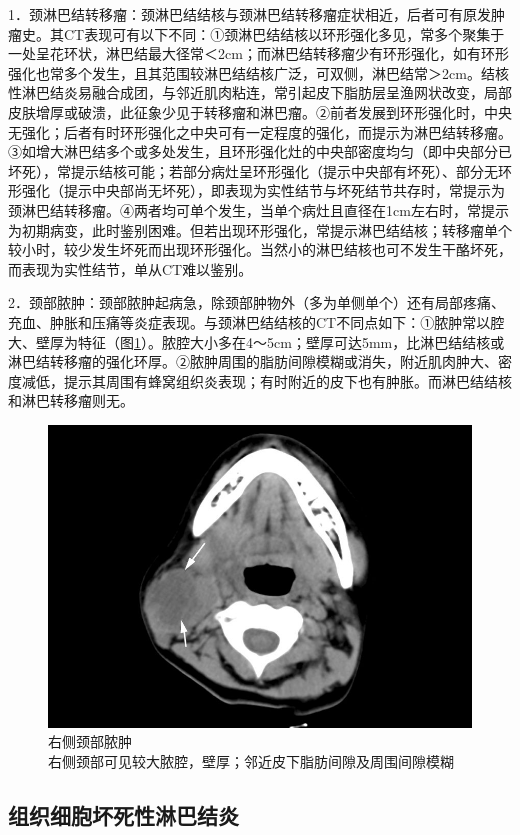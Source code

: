 1．颈淋巴结转移瘤：颈淋巴结结核与颈淋巴结转移瘤症状相近，后者可有原发肿瘤史。其CT表现可有以下不同：①颈淋巴结结核以环形强化多见，常多个聚集于一处呈花环状，淋巴结最大径常＜2cm；而淋巴结转移瘤少有环形强化，如有环形强化也常多个发生，且其范围较淋巴结结核广泛，可双侧，淋巴结常＞2cm。结核性淋巴结炎易融合成团，与邻近肌肉粘连，常引起皮下脂肪层呈渔网状改变，局部皮肤增厚或破溃，此征象少见于转移瘤和淋巴瘤。②前者发展到环形强化时，中央无强化；后者有时环形强化之中央可有一定程度的强化，而提示为淋巴结转移瘤。③如增大淋巴结多个或多处发生，且环形强化灶的中央部密度均匀（即中央部分已坏死），常提示结核可能；若部分病灶呈环形强化（提示中央部有坏死）、部分无环形强化（提示中央部尚无坏死），即表现为实性结节与坏死结节共存时，常提示为颈淋巴结转移瘤。④两者均可单个发生，当单个病灶且直径在1cm左右时，常提示为初期病变，此时鉴别困难。但若出现环形强化，常提示淋巴结结核；转移瘤单个较小时，较少发生坏死而出现环形强化。当然小的淋巴结核也可不发生干酪坏死，而表现为实性结节，单从CT难以鉴别。

2．颈部脓肿：颈部脓肿起病急，除颈部肿物外（多为单侧单个）还有局部疼痛、充血、肿胀和压痛等炎症表现。与颈淋巴结结核的CT不同点如下：①脓肿常以腔大、壁厚为特征（图\ref{fig8-6}）。脓腔大小多在4～5cm；壁厚可达5mm，比淋巴结结核或淋巴结转移瘤的强化环厚。②脓肿周围的脂肪间隙模糊或消失，附近肌肉肿大、密度减低，提示其周围有蜂窝组织炎表现；有时附近的皮下也有肿胀。而淋巴结结核和淋巴转移瘤则无。

\begin{figure}[!htbp]
 \centering
 \includegraphics[width=.7\textwidth,height=\textheight,keepaspectratio]{./images/Image00173.jpg}
 \captionsetup{justification=centering}
 \caption{右侧颈部脓肿\\{\small 右侧颈部可见较大脓腔，壁厚；邻近皮下脂肪间隙及周围间隙模糊}}
 \label{fig8-6}
  \end{figure} 

\subsection{组织细胞坏死性淋巴结炎}

